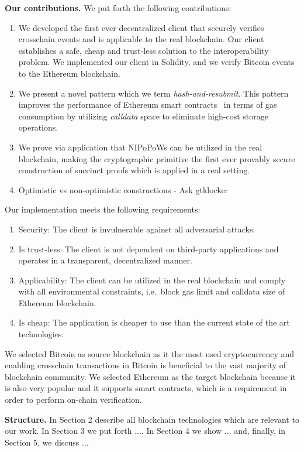 \textbf{Our contributions.} We put forth the following contributions:
\begin{enumerate}
\item We developed the first ever decentralized client that securely verifies
crosschain events and is applicable to the real blockchain. Our client
establishes a safe, cheap and trust-less solution to the interoperability
problem. We implemented our client in Solidity, and we verify Bitcoin events
to the Ethereum blockchain.
\item We present a novel pattern which we term \emph{hash-and-resubmit}. This
pattern improves the performance of Ethereum smart contracts~\cite{wood,
buterin} in terms of gas consumption by utilizing \emph{calldata} space to
eliminate high-cost storage operations.
\item We prove via application that NIPoPoWs can be utilized in the real
blockchain, making the cryptographic primitive the first ever provably secure
construction of succinct proofs which is applied in a real setting.
\item Optimistic vs non-optimistic constructions - Ask gtklocker
\end{enumerate}

\bigbreak
Our implementation meets the following requirements:
\begin{enumerate}
\item Security: The client is invulnerable against all adversarial attacks.
\item Is trust-less: The client is not dependent on third-party applications
and operates in a transparent, decentralized manner.
\item Applicability: The client can be utilized in the real blockchain and
comply with all environmental constraints, i.e.\ block gas limit and calldata
size of Ethereum blockchain.
\item Is cheap: The application is cheaper to use than the current state of the
art technologies.
\end{enumerate}

We selected Bitcoin as source blockchain as it the most used cryptocurrency and
enabling crosschain transactions in Bitcoin is beneficial to the vast majority
of blockchain community. We selected Ethereum as the target blockchain because
it is also very popular and it supports smart contracts, which is a requirement
in order to perform on-chain verification.

\noindent

\textbf{Structure.} In Section 2 describe all blockchain technologies which are
relevant to our work. In Section 3 we put forth .... In Section 4 we show
... and, finally, in Section 5, we discuss ...


